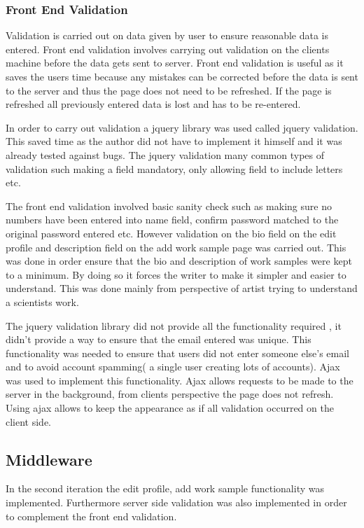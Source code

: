 \documentclass[a4paper,oneside,11pt]{report}
\begin{document}
\subsubsection{Front End Validation}
Validation is carried out on data given by user to ensure reasonable data is entered. Front end validation involves carrying out validation on the clients machine before the data gets sent to server. Front end validation is useful as it saves the users time because any mistakes can be corrected before the data is sent to the server and thus the page does not need to be refreshed. If the page is refreshed all previously entered data is lost and has to be re-entered.

In order to carry out validation a jquery library was used called jquery validation. This saved time as the author did not have to implement it himself and it was already tested against bugs. The jquery validation many common types of validation such making a field mandatory, only allowing field to include letters etc. 

The front end validation involved basic sanity check such as making sure no numbers have been entered into name field, confirm password matched to the original password entered etc. However validation on the bio field on the edit profile and description field on the add work sample page was carried out. This was done in order ensure that the bio and description of work samples were kept to a minimum. By doing so it forces the writer to make it simpler and easier to understand. This was done mainly from perspective of artist trying to understand a scientists work.

The jquery validation library did not provide all the functionality required , it didn’t provide a way to ensure that the email entered was unique. This functionality was needed to ensure that users did not enter someone else’s email and to avoid account spamming( a single user creating lots of accounts). Ajax was used to implement this functionality. Ajax allows requests to be made to the server in the background, from clients perspective the page does not refresh. Using ajax allows to keep the appearance as if all validation occurred on the client side.


\subsection{Middleware}
In the second iteration the edit profile, add work sample functionality was implemented. Furthermore server side validation was also implemented in order to complement the front end validation.
\end{document}
